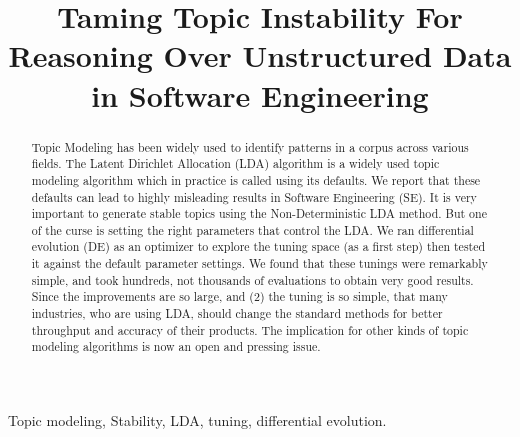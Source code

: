\documentclass[conference]{IEEEtran}
\theoremstyle{break}
\begin{document}
\title{\textbf{Taming Topic Instability For Reasoning Over Unstructured Data in Software Engineering}}


\author{

\and
{}
\and
{}

}

\maketitle


\begin{abstract}
Topic Modeling has been widely used to identify patterns in a corpus across various fields. The Latent Dirichlet Allocation (LDA) algorithm is a widely used topic modeling algorithm which in practice is called using its defaults. We report that these defaults can lead to highly misleading results in Software Engineering (SE). It is very important to generate stable topics using the Non-Deterministic LDA method. But one of the curse is setting the right parameters that control the LDA. We ran differential evolution (DE) as an optimizer to explore the tuning space (as a first step) then tested it against the default parameter settings. We found that these tunings were remarkably simple, and took hundreds, not thousands of evaluations to obtain very good results. Since the improvements are so large, and (2) the tuning is so simple, that many industries, who are using LDA, should change the standard methods for better throughput and accuracy of their products. The implication for other kinds of topic modeling algorithms is now an open and pressing issue.
\end{abstract}

\begin{IEEEkeywords}
Topic modeling, Stability, LDA, tuning, differential evolution.
\end{IEEEkeywords}


\IEEEpeerreviewmaketitle
\end{document}
